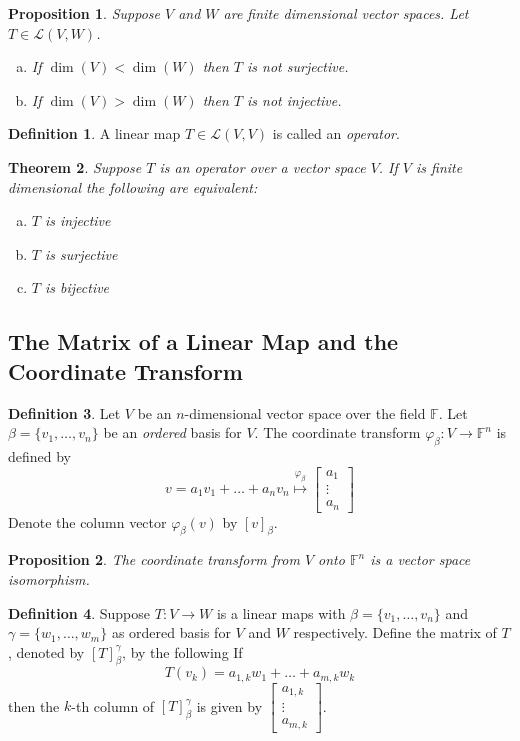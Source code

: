 \documentclass[12pt,letterpaper]{article}
\theoremstyle{plain}
\newtheorem{theorem}{Theorem}[section]
\newtheorem{proposition}{Proposition}[section]
\theoremstyle{definition}
\newtheorem{definition}[theorem]{Definition}
\numberwithin{equation}{section}
\begin{document}
\begin{proposition} Suppose $V$ and $W$ are finite dimensional vector spaces. Let $T\in \mathcal{L}(V,W)$. 
\begin{enumerate}[a)]
\item If $\dim(V)<\dim(W)$ then $T$ is not surjective.
\item If $\dim(V)>\dim(W)$ then $T$ is not injective.
\end{enumerate}
\end{proposition}

\begin{definition} A linear map $T\in \mathcal{L}(V,V)$ is called an \emph{operator}. 
\end{definition}
\begin{theorem} Suppose $T$ is an operator over a vector space $V$. If $V$ is finite dimensional the following are equivalent:
\begin{enumerate}[a)]
\item $T$ is injective
\item $T$ is surjective
\item $T$ is bijective
\end{enumerate}
\end{theorem}

\subsection{The Matrix of a Linear Map and the Coordinate Transform}
\begin{definition} Let $V$ be an $n$-dimensional vector space over the field $\mathbb{F}$. Let $\beta=\{v_1, \ldots, v_n\}$ be an \emph{ordered} basis for $V$. The coordinate transform $\varphi_\beta:V\rightarrow \mathbb{F}^n$ is defined by 
\[v=a_1v_1+\ldots+a_nv_n\overset{\varphi_\beta}{\longmapsto} \begin{bmatrix}a_1\\ \vdots \\ a_n\end{bmatrix}\]
Denote the column vector $\varphi_\beta(v)$ by $[v]_\beta$.
\end{definition}
\begin{proposition} The coordinate transform from $V$ onto $\mathbb{F}^n$ is a vector space isomorphism.
\end{proposition}

\begin{definition} Suppose $T:V\rightarrow W$ is a linear maps with $\beta=\{v_1,\ldots, v_n\}$ and $\gamma=\{w_1, \ldots, w_m\}$ as ordered basis for $V$ and $W$ respectively. Define the matrix of $T$, denoted by $[T]_\beta^\gamma$, by the following
If 
\[T(v_k)=a_{1,k}w_1+\ldots +a_{m,k}w_k\]
then the $k$-th column of $[T]_\beta^\gamma$ is given by $\begin{bmatrix} a_{1,k}\\ \vdots \\ a_{m,k}\end{bmatrix}$. 
\end{definition}
\end{document}
